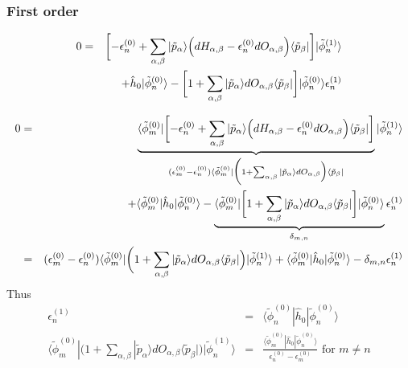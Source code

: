 \documentclass[11pt,a4paper]{report}
\begin{document}
\subsubsection{First order}

\begin{eqnarray}
0&=&\biggl[-\epsilon_n^{(0)}
+\sum_{\alpha,\beta}|\tilde{p}_\alpha\rangle
\Bigl(dH_{\alpha,\beta}-\epsilon_n^{(0)} dO_{\alpha,\beta}\Bigr)
\langle\tilde{p}_\beta|\biggr]|\tilde{\phi}^{(1)}_n\rangle
\nonumber\\
&&+
\hat{h}_0|\tilde{\phi}_n^{(0)}\rangle
-\biggl[1
+\sum_{\alpha,\beta}|\tilde{p}_\alpha\rangle
dO_{\alpha,\beta}
\langle\tilde{p}_\beta|\biggr]|\tilde{\phi}_n^{(0)}\rangle
\epsilon_n^{(1)}
\end{eqnarray}

\begin{eqnarray}
0&=&
\underbrace{\langle\tilde{\phi}_m^{(0)}|\biggl[-\epsilon_n^{(0)}
+\sum_{\alpha,\beta}|\tilde{p}_\alpha\rangle
\Bigl(dH_{\alpha,\beta}-\epsilon_n^{(0)} dO_{\alpha,\beta}\Bigr)
\langle\tilde{p}_\beta|\biggr]}
_{(\epsilon_m^{(0)}-\epsilon_n^{(0)})
\langle\tilde{\phi}_m^{(0)}|
\biggl(1+\sum_{\alpha,\beta}|\tilde{p}_\alpha\rangle dO_{\alpha,\beta}\Bigr)
\langle\tilde{p}_\beta|}
|\tilde{\phi}^{(1)}_n\rangle
\nonumber\\
&&+
\langle\tilde{\phi}_m^{(0)}|\hat{h}_0|\tilde{\phi}_n^{(0)}\rangle
-
\underbrace{\langle\tilde{\phi}_m^{(0)}|\biggl[1
+\sum_{\alpha,\beta}|\tilde{p}_\alpha\rangle
dO_{\alpha,\beta}
\langle\tilde{p}_\beta|\biggr]|\tilde{\phi}_n^{(0)}\rangle}_{\delta_{m,n}}
\epsilon_n^{(1)}
\nonumber\\
&=&
(\epsilon_m^{(0)}-\epsilon_n^{(0)})
\langle\tilde{\phi}_m^{(0)}|
\biggl(1+\sum_{\alpha,\beta}|\tilde{p}_\alpha\rangle dO_{\alpha,\beta}
\langle\tilde{p}_\beta|\Bigr)|\tilde{\phi}^{(1)}_n\rangle
+\langle\tilde{\phi}_m^{(0)}|\hat{h}_0|\tilde{\phi}_n^{(0)}\rangle
-\delta_{m,n}\epsilon_n^{(1)}
\end{eqnarray}
Thus
\begin{eqnarray}
\epsilon_n^{(1)}&=&
\langle\tilde{\phi}_n^{(0)}|\hat{h}_0|\tilde{\phi}_n^{(0)}\rangle
\nonumber\\
\langle\tilde{\phi}_m^{(0)}|
\biggl(1+\sum_{\alpha,\beta}|\tilde{p}_\alpha\rangle dO_{\alpha,\beta}
\langle\tilde{p}_\beta|\Bigr)|\tilde{\phi}^{(1)}_n\rangle
&=&
\frac{\langle\tilde{\phi}_m^{(0)}|\hat{h}_0|\tilde{\phi}_n^{(0)}\rangle}
{\epsilon_n^{(0)}-\epsilon_m^{(0)}}
\text{ for $m\neq n$}\\
\end{eqnarray}
\end{document}
